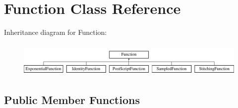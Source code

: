 \hypertarget{class_function}{}\section{Function Class Reference}
\label{class_function}
Inheritance diagram for Function\+:\begin{figure}[H]
\begin{center}
\leavevmode
\includegraphics[height=1.671642cm]{class_function}
\end{center}
\end{figure}
\subsection*{Public Member Functions}
